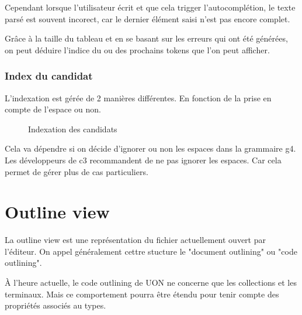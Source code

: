 \documentclass[
    iict, %
    il, %
]{heig-tb}
\begin{document}
Cependant lorsque l'utilisateur écrit et que cela trigger l'autocomplétion, le texte parsé est souvent incorect, car le dernier élément saisi n'est pas encore complet.

Grâce à la taille du tableau et en se basant sur les erreurs qui ont été générées, on peut déduire l'indice du ou des prochains tokens que l'on peut afficher.

\subsubsection{Index du candidat}
L'indexation est gérée de 2 manières différentes. En fonction de la prise en compte de l'espace ou non.

\begin{figure}[!h]
    \begin{center}
    \end{center}
    \caption[Indexation des candidats]{\label{candidat-index} Indexation des candidats}
\end{figure}

Cela va dépendre si on décide d'ignorer ou non les espaces dans la grammaire g4.
Les développeurs de c3 recommandent de ne pas ignorer les espaces. Car cela permet de gérer plus de cas particuliers.

\section{Outline view}

La outline view est une représentation du fichier actuellement ouvert par l'éditeur.
On appel généralement cettre stucture le "document outlining" ou "code outlining".

À l'heure actuelle, le code outlining de UON ne concerne que les collections et les terminaux.
Mais ce comportement pourra être étendu pour tenir compte des propriétés associés au types.
\end{document}
